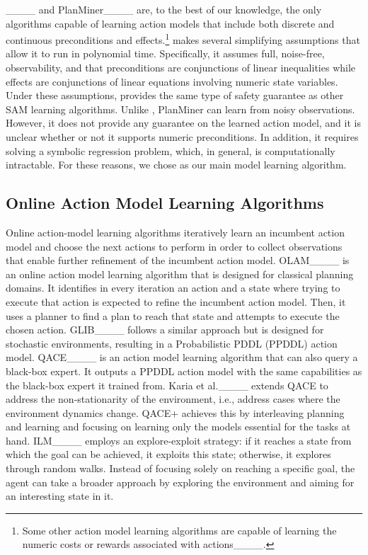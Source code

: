 \nsam____ and 
PlanMiner____ are, to the best of our knowledge, the only algorithms capable of learning action models that include both discrete and continuous preconditions and effects.\footnote{Some other action model learning algorithms are capable of learning the numeric costs or rewards associated with actions____.} 
\nsam makes several simplifying assumptions that allow it to run in polynomial time.
Specifically, it assumes full, noise-free, observability, 
and that preconditions are conjunctions of linear inequalities while effects are conjunctions of linear equations involving numeric state variables. 
Under these assumptions, \nsam provides the same type of safety guarantee as other SAM learning algorithms. 
Unlike \nsam, PlanMiner can learn from noisy observations. 
However, it does not provide any guarantee on the learned action model, and it is unclear whether or not it supports numeric preconditions. 
In addition, it requires solving a symbolic regression problem, which, in general, is computationally intractable. 
For these reasons, we chose \nsam as our main model learning algorithm.


\subsection{Online Action Model Learning Algorithms}
\label{sec:related-online-action-model-learning}
Online action-model learning algorithms 
iteratively learn an incumbent action model and choose the next actions to perform in order to collect observations that enable further refinement of the incumbent action model. 
OLAM____ is an online action model learning algorithm that is designed for classical planning domains. It identifies in every iteration an action and a state where trying to execute that action is expected to refine the incumbent action model. 
Then, it uses a planner to find a plan to reach that state and attempts to execute the chosen action. 
GLIB____ follows a similar approach but is designed for stochastic environments, resulting in a Probabilistic PDDL (PPDDL) action model.
QACE____ is an action model learning algorithm that can also query a black-box expert. It outputs a PPDDL action model with the same capabilities as the black-box expert it trained from. 
Karia et al.____ extends QACE to address the non-stationarity of the environment, i.e., address cases where the environment dynamics change. QACE+ achieves this by interleaving planning and learning and focusing on learning only the models essential for the tasks at hand.
ILM____ employs an explore-exploit strategy: if it reaches a state from which the goal can be achieved, it exploits this state; otherwise, it explores through random walks.
Instead of focusing solely on reaching a specific goal, the agent can take a broader approach by exploring the environment and aiming for an interesting state in it.




